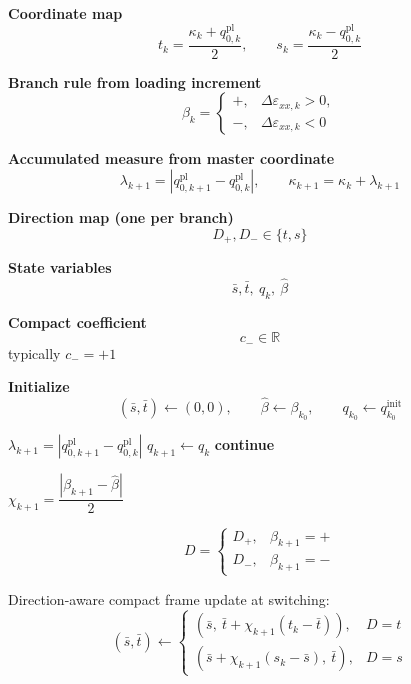 \documentclass[11pt,a4paper]{article}
\begin{document}
\newpage
\begin{algorithm}[H]
\caption{Compact Incremental Branchwise Evolution in $(s,t)$ Coordinates}
\begin{algorithmic}[1]

\State \textbf{Coordinate map}
\[
t_k=\frac{\kappa_k+q_{0,k}^{\mathrm{pl}}}{2},
\qquad
s_k=\frac{\kappa_k-q_{0,k}^{\mathrm{pl}}}{2}
\]

\State \textbf{Branch rule from loading increment}
\[
\beta_k=
\begin{cases}
+,& \Delta\varepsilon_{xx,k}>0,\\
-,& \Delta\varepsilon_{xx,k}<0
\end{cases}
\]

\State \textbf{Accumulated measure from master coordinate}
\[
\lambda_{k+1}=|q_{0,k+1}^{\mathrm{pl}}-q_{0,k}^{\mathrm{pl}}|,
\qquad
\kappa_{k+1}=\kappa_k+\lambda_{k+1}
\]

\State \textbf{Direction map (one per branch)}
\[
D_+,D_-\in\{t,s\}
\]

\State \textbf{State variables}
\[
\bar s,\bar t,\ q_k,\ \hat\beta
\]

\State \textbf{Compact coefficient}
\[
c_-\in\mathbb{R}
\]
\Statex \hspace{\algorithmicindent} typically $c_-=+1$

\State \textbf{Initialize}
\[
(\bar s,\bar t)\gets(0,0),\qquad
\hat\beta\gets\beta_{k_0},\qquad
q_{k_0}\gets q_{k_0}^{\mathrm{init}}
\]

    \State $\lambda_{k+1}=|q_{0,k+1}^{\mathrm{pl}}-q_{0,k}^{\mathrm{pl}}|$
        \State $q_{k+1}\gets q_k$
        \State \textbf{continue}
    \EndIf

    \State $\chi_{k+1}=\dfrac{|\beta_{k+1}-\hat\beta|}{2}$

    \State
    \[
    D=
    \begin{cases}
    D_+, & \beta_{k+1}=+\\
    D_-, & \beta_{k+1}=-
    \end{cases}
    \]

    \State Direction-aware compact frame update at switching:
    \[
    (\bar s,\bar t)\gets
    \begin{cases}
    (\bar s,\ \bar t+\chi_{k+1}(t_k-\bar t)), & D=t\\
    (\bar s+\chi_{k+1}(s_k-\bar s),\ \bar t), & D=s
    \end{cases}
    \]


\end{algorithmic}
\end{algorithm}
\end{document}
